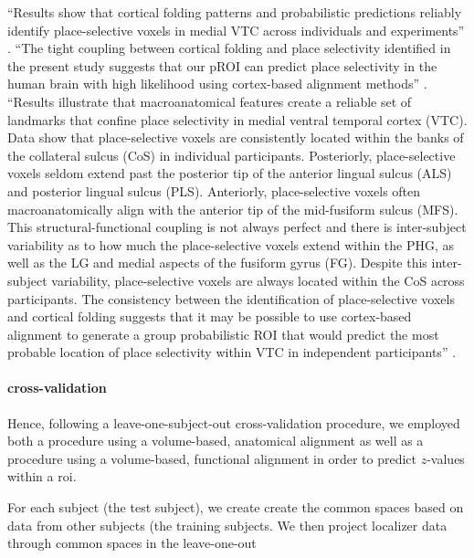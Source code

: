 %
``Results show that cortical folding patterns and probabilistic predictions
reliably identify place-selective voxels in medial VTC across individuals and
experiments'' \citep{weiner2018defining}.
%
``The tight coupling between cortical folding and place selectivity identified
in the present study suggests that our pROI can predict place selectivity in the
human brain with high likelihood using cortex-based alignment methods''
\citep{weiner2018defining}.
%
``Results illustrate that macroanatomical features create a reliable set of
landmarks that confine place selectivity in medial ventral temporal cortex
(VTC).
%
Data show that place-selective voxels are consistently located within the banks
of the collateral sulcus (CoS) in individual participants.
%
Posteriorly, place-selective voxels seldom extend past the posterior tip of the
anterior lingual sulcus (ALS) and posterior lingual sulcus (PLS).
%
Anteriorly, place-selective voxels often macroanatomically align with the
anterior tip of the mid-fusiform sulcus (MFS).
%
This structural-functional coupling is not always perfect and there is
inter-subject variability as to how much the place-selective voxels extend
within the PHG, as well as the LG and medial aspects of the fusiform gyrus (FG).
%
Despite this inter-subject variability, place-selective voxels are always
located within the CoS across participants.
%
The consistency between the identification of place-selective voxels and
cortical folding suggests that it may be possible to use cortex-based alignment
to generate a group probabilistic ROI that would predict the most probable
location of place selectivity within VTC in independent participants''
\citep{weiner2018defining}.


\paragraph{cross-validation}




Hence, following a leave-one-subject-out cross-validation procedure, we employed
both a procedure using a volume-based, anatomical alignment as well as a
procedure using a volume-based, functional alignment in order to predict
$z$-values within a \ac{roi}.

For each subject (the test subject), we create create the common spaces based on
data from other subjects (the training subjects.
%
We then project localizer data through common spaces in the leave-one-out


